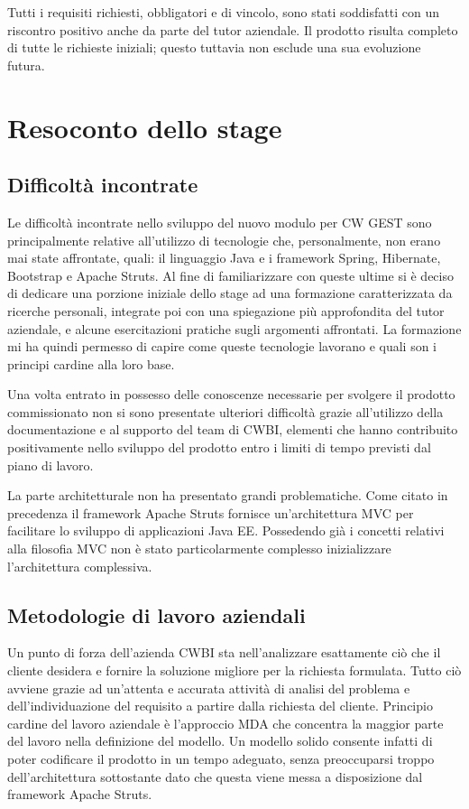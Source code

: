 \noindent Tutti i requisiti richiesti, obbligatori e di vincolo, sono stati soddisfatti con un riscontro positivo anche da parte del tutor aziendale. Il prodotto risulta completo di tutte le richieste iniziali; questo tuttavia non esclude una sua evoluzione futura.

\pagebreak

\section{Resoconto dello stage}

\subsection{Difficoltà incontrate}
Le difficoltà incontrate nello sviluppo del nuovo modulo per CW GEST sono principalmente relative all'utilizzo di tecnologie che, personalmente, non erano mai state affrontate, quali: il linguaggio Java e i framework Spring, Hibernate, Bootstrap e Apache Struts. Al fine di familiarizzare con queste ultime si è deciso di dedicare una porzione iniziale dello stage ad una formazione caratterizzata da ricerche personali, integrate poi con una spiegazione più approfondita del tutor aziendale, e alcune esercitazioni pratiche sugli argomenti affrontati. La formazione mi ha quindi permesso di capire come queste tecnologie lavorano e quali son i principi cardine alla loro base.  

\setlength{\parskip}{3ex}

\noindent Una volta entrato in possesso delle conoscenze necessarie per svolgere il prodotto commissionato non si sono presentate ulteriori difficoltà grazie all'utilizzo della documentazione e al supporto del team di CWBI, elementi che hanno contribuito positivamente nello sviluppo del prodotto entro i limiti di tempo previsti dal piano di lavoro.

\setlength{\parskip}{3ex}

\noindent La parte architetturale non ha presentato grandi problematiche. Come citato in precedenza il framework Apache Struts fornisce un'architettura MVC per facilitare lo sviluppo di applicazioni Java EE. Possedendo già i concetti relativi alla filosofia MVC non è stato particolarmente complesso inizializzare l'architettura complessiva. 

\subsection{Metodologie di lavoro aziendali}
Un punto di forza dell'azienda CWBI sta nell'analizzare esattamente ciò che il cliente desidera e fornire la soluzione migliore per la richiesta formulata. Tutto ciò avviene grazie ad un'attenta e accurata attività di analisi del problema e dell'individuazione del requisito a partire dalla richiesta del cliente. Principio cardine del lavoro aziendale è l'approccio MDA che concentra la maggior parte del lavoro nella definizione del modello. Un modello solido consente infatti di poter codificare il prodotto in un tempo adeguato, senza preoccuparsi troppo dell'architettura sottostante dato che questa viene messa a disposizione dal framework Apache Struts. 

